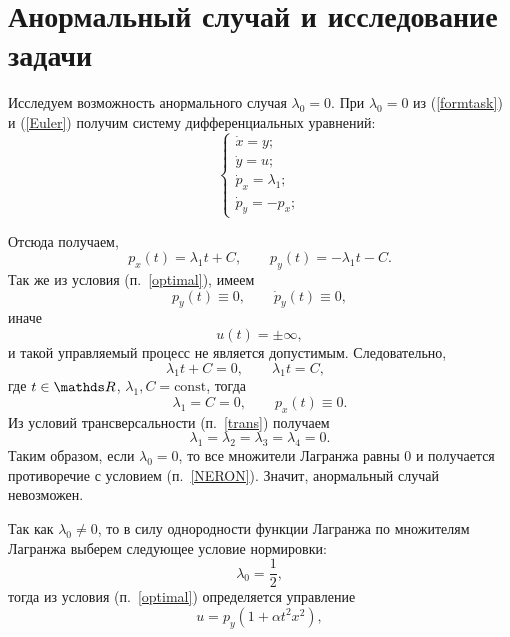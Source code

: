\section{Анормальный случай и исследование задачи}
Исследуем возможность анормального случая $\lambda_0 = 0$. При  $\lambda_0 = 0$ из (\ref{formtask}) и (\ref{Euler}) получим систему дифференциальных уравнений:
\begin{equation}
	\begin{cases}
	\dot{x} = y;\\
	\dot{y} = u;\\
	\dot{p}_x = \lambda_1;\\
	\dot{p}_y = -p_x;
	\end{cases}
\end{equation}

Отсюда получаем, 
\[
p_x(t) = \lambda_1 t + C, \qquad p_y(t) = - \lambda_1 t - C. 
\]
Так же из условия (п.~\ref{optimal}), имеем 
\[
p_y(t) \equiv 0, \qquad
\dot{p}_y(t) \equiv 0,
\] 
иначе 
\[
u(t) = \pm \infty,
\] 
и такой управляемый процесс не является допустимым. Следовательно, 
\[
\lambda_1 t + C = 0,\qquad
\lambda_1 t = C, \qquad 
\]
где $t \in \R$, $\lambda_1, C = \mathrm{const}$, тогда
\[
\lambda_1 = C = 0, \qquad
p_x(t) \equiv 0.
\]
Из условий трансверсальности (п.~\ref{trans}) получаем 
\[
\lambda_1 = \lambda_2 = \lambda_3 = \lambda_4 = 0. 
\]
Таким образом, если $\lambda_0 = 0$, то все множители Лагранжа равны $0$ и получается противоречие с условием (п.~\ref{NERON}). Значит, анормальный случай невозможен.

Так как $\lambda_0 \not= 0$, то в силу однородности функции Лагранжа по множителям Лагранжа выберем следующее условие нормировки:
\[
\lambda_0 = \frac{1}{2},
\]
тогда из условия (п.~\ref{optimal}) определяется управление
\begin{equation}
u = p_y (1 + \alpha t^2x^2), 
\end{equation}
